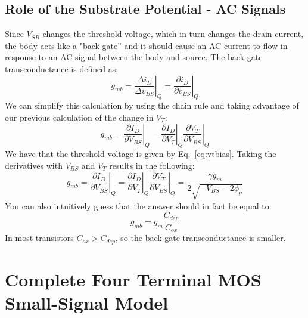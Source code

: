 \subsection{Role of the Substrate Potential - AC Signals}
Since $V_{SB}$ changes the threshold voltage, which in turn changes the drain current, the body acts like a "back-gate” and it should cause an AC current to flow in response to an AC signal between the body and source.  The back-gate transconductance is defined as:
    \begin{equation} 
        {g_{mb}} = {\left. {\frac{{\Delta {i_D}}}{{\Delta {v_{BS}}}}} \right|_Q} = {\left. {\frac{{\partial {i_D}}}{{\partial {v_{BS}}}}} \right|_Q} 
    \end{equation}
We can simplify this calculation by using the chain rule and taking advantage of our previous calculation of the change in $V_T$:
    \begin{equation}
        {g_{mb}} = {\left. {\frac{{\partial {I_D}}}{{\partial {V_{BS}}}}} \right|_Q} = {\left. {\frac{{\partial {I_D}}}{{\partial {V_{T}}}}} \right|_Q}{\left. {\frac{{\partial {V_{T}}}}{{\partial {V_{BS}}}}} \right|_Q}
    \end{equation}
We have that the threshold voltage is given by Eq.~\ref{eq:vtbias}.  Taking the derivatives with $V_{BS}$ and $V_T$ results in the following:
    \begin{equation}
        {g_{mb}} = {\left. {\frac{{\partial {I_D}}}{{\partial {V_{BS}}}}} \right|_Q} = {\left. {\frac{{\partial {I_D}}}{{\partial {V_{T}}}}} \right|_Q}{\left. {\frac{{\partial {V_{T}}}}{{\partial {V_{BS}}}}} \right|_Q} = \frac{{\gamma {g_m}}}{{2\sqrt { - {V_{BS}} - 2{\phi _p}} }}
    \end{equation}
You can also intuitively guess that the answer should in fact be equal to:
    \begin{equation}
        g_{mb} = g_m \frac{C_{dep}}{C_{ox}}
    \end{equation}
In most transistors $C_{ox} > C_{dep}$, so the back-gate transconductance is smaller.   
\section{Complete Four Terminal MOS Small-Signal Model}
